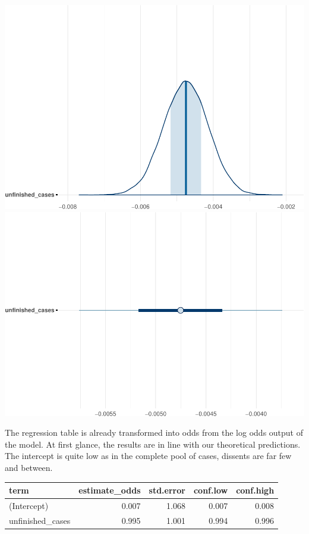 \documentclass[
  11pt,
]{article}
\begin{document}
\includegraphics{dissents_article_files/figure-latex/interpreting_posterior2-1.pdf}
\includegraphics{dissents_article_files/figure-latex/interpreting_posterior2-2.pdf}

The regression table is already transformed into odds from the log odds
output of the model. At first glance, the results are in line with our
theoretical predictions. The intercept is quite low as in the complete
pool of cases, dissents are far few and between.

\begin{longtable}[]{@{}lrrrr@{}}
\toprule\noalign{}
term & estimate\_odds & std.error & conf.low & conf.high \\
\midrule\noalign{}
\endhead
\bottomrule\noalign{}
\endlastfoot
(Intercept) & 0.007 & 1.068 & 0.007 & 0.008 \\
unfinished\_cases & 0.995 & 1.001 & 0.994 & 0.996 \\
\end{longtable}
\end{document}
